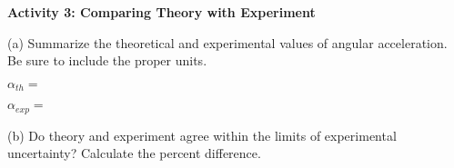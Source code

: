 \textbf{Activity 3: Comparing Theory with Experiment }

(a) Summarize the theoretical and experimental values of angular acceleration. 
Be sure to include the proper units.
\vspace{10mm}

\( \alpha _{th}= \)
\vspace{10mm}

\( \alpha _{exp}= \) 
\vspace{15mm}

(b) Do theory and experiment agree within the limits of experimental 
uncertainty? Calculate the percent difference.


